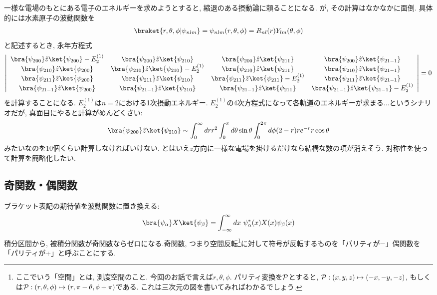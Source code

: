 \documentclass[10.5pt,a4paper]{jreport}
\begin{document}
一様な電場のもとにある電子のエネルギーを求めようとすると, 縮退のある摂動論に頼ることになる. が, その計算はなかなかに面倒. 具体的には水素原子の波動関数を
\begin{eqnarray}
  \braket{r, \theta, \phi|\psi_{nlm}} = \psi_{nlm}(r, \theta, \phi) = R_{nl}(r)Y_{lm}(\theta, \phi)
\end{eqnarray}
と記述するとき, 永年方程式
\begin{eqnarray}
  \left|
  \nonumber    \begin{array}{cccc}
    \bra{\psi_{200}}\hat{z}\ket{\psi_{200}}-E^{(1)}_2 & \bra{\psi_{200}}\hat{z}\ket{\psi_{210}} & \bra{\psi_{200}}\hat{z}\ket{\psi_{211}}& \bra{\psi_{200}}\hat{z}\ket{\psi_{21-1}} \\
    \bra{\psi_{210}}\hat{z}\ket{\psi_{200}} & \bra{\psi_{210}}\hat{z}\ket{\psi_{210}}-E^{(1)}_2 & \bra{\psi_{210}}\hat{z}\ket{\psi_{211}} & \bra{\psi_{210}}\hat{z}\ket{\psi_{21-1}}\\
    \bra{\psi_{211}}\hat{z}\ket{\psi_{200}} & \bra{\psi_{211}}\hat{z}\ket{\psi_{210}} & \bra{\psi_{211}}\hat{z}\ket{\psi_{211}}-E^{(1)}_2 &\bra{\psi_{211}}\hat{z}\ket{\psi_{21-1}}\\
    \bra{\psi_{21-1}}\hat{z}\ket{\psi_{200}} &\bra{\psi_{21-1}}\hat{z}\ket{\psi_{210}} & \bra{\psi_{21-1}}\hat{z}\ket{\psi_{211}} &\bra{\psi_{21-1}}\hat{z}\ket{\psi_{21-1}}-E^{(1)}_2
  \end{array}
  \right|=0\\
\end{eqnarray}
を計算することになる. $E_2^{(1)}$は$n=2$における1次摂動エネルギー. $E_2^{(1)}$の4次方程式になって各軌道のエネルギーが求まる...というシナリオだが, 真面目にやると計算がめんどくさい:
\begin{eqnarray}
  \bra{\psi_{200}}\hat{z}\ket{\psi_{210}} \sim \int_0^\infty dr r^2\int_0^\pi d\theta \sin{\theta}\int_0^{2\pi} d\phi(2-r)re^{-r}r\cos{\theta}
\end{eqnarray}
みたいなのを10個くらい計算しなければいけない. とはいえ$z$方向に一様な電場を掛けるだけなら結構な数の項が消えそう. 対称性を使って計算を簡略化したい.
\subsection{奇関数・偶関数}
ブラケット表記の期待値を波動関数に置き換える:
\begin{eqnarray}
  \bra{\psi_\alpha}X\ket{\psi_\beta} = \int_{-\infty}^\infty dx\ \psi^*_\alpha(x) X(x)\psi_\beta(x)
\end{eqnarray}
積分区間から, 被積分関数が奇関数ならゼロになる.奇関数, つまり空間反転\footnote{ここでいう「空間」とは, 測度空間のこと. 今回のお話で言えば$r, \theta, \phi$. パリティ変換を${\cal P}$とすると, ${\cal P}:(x, y, z)\mapsto (-x, -y, -z)$, もしくは${\cal P}:(r, \theta, \phi)\mapsto (r, \pi-\theta, \phi + \pi)$である. これは三次元の図を書いてみればわかるでしょう.}に対して符号が反転するものを「パリティが$-$」偶関数を「パリティが+」と呼ぶことにする.
\end{document}
